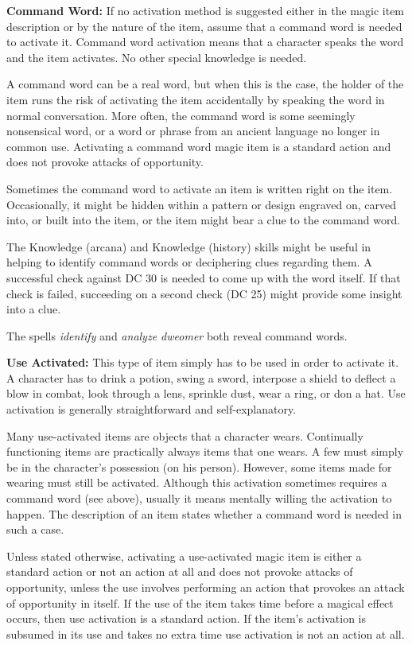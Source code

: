 \documentclass{article}
\begin{document}
\textbf{Command Word: }If no activation method is suggested either in the magic 
item description or by the nature of the item, assume that a command word is needed 
to activate it. Command word activation means that a character speaks the word 
and the item activates. No other special knowledge is needed.

A command word can be a real word, but when this is the case, the holder of the 
item runs the risk of activating the item accidentally by speaking the word in 
normal conversation. More often, the command word is some seemingly nonsensical 
word, or a word or phrase from an ancient language no longer in common use. Activating 
a command word magic item is a standard action and does not provoke attacks of 
opportunity.

Sometimes the command word to activate an item is written right on the item. Occasionally, 
it might be hidden within a pattern or design engraved on, carved into, or built 
into the item, or the item might bear a clue to the command word.

The Knowledge (arcana) and Knowledge (history) skills might be useful in helping 
to identify command words or deciphering clues regarding them. A successful check 
against DC 30 is needed to come up with the word itself. If that check is failed, 
succeeding on a second check (DC 25) might provide some insight into a clue.

The spells \textit{identify }and \textit{analyze dweomer }both reveal command words.

\textbf{Use Activated:} This type of item simply has to be used in order to activate 
it. A character has to drink a potion, swing a sword, interpose a shield to deflect 
a blow in combat, look through a lens, sprinkle dust, wear a ring, or don a hat. 
Use activation is generally straightforward and self-explanatory.

Many use-activated items are objects that a character wears. Continually functioning 
items are practically always items that one wears. A few must simply be in the 
character's possession (on his person). However, some items made for wearing\textit{ 
}must still be activated. Although this activation sometimes requires a command 
word (see above), usually it means mentally willing the activation to happen. The 
description of an item states whether a command word is needed in such a case.

Unless stated otherwise, activating a use-activated magic item is either a standard 
action or not an action at all and does not provoke attacks of opportunity, unless 
the use involves performing an action that provokes an attack of opportunity in 
itself. If the use of the item takes time before a magical effect occurs, then 
use activation is a standard action. If the item's activation is subsumed in its 
use and takes no extra time use activation is not an action at all.
\end{document}
